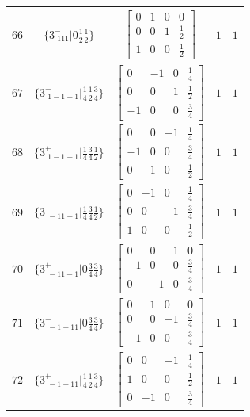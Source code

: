 \documentclass[fleqn,8pt]{jsarticle}
\begin{document}
\begin{longtable}{ccccc}
$ 66 $ & $ \{3^{-}_{\,\,111}|0 \frac{1}{2} \frac{1}{2}\} $ & $ \begin{bmatrix} 0 & 1 & 0 & 0 \\ 0 & 0 & 1 & \frac{1}{2} \\ 1 & 0 & 0 & \frac{1}{2} \end{bmatrix} $ & $ 1 $ & $ 1 $ \\ \hline
$ 67 $ & $ \{3^{-}_{\,\,1-1-1}|\frac{1}{4} \frac{1}{2} \frac{3}{4}\} $ & $ \begin{bmatrix} 0 & -1 & 0 & \frac{1}{4} \\ 0 & 0 & 1 & \frac{1}{2} \\ -1 & 0 & 0 & \frac{3}{4} \end{bmatrix} $ & $ 1 $ & $ 1 $ \\ \hline
$ 68 $ & $ \{3^{+}_{\,\,1-1-1}|\frac{1}{4} \frac{3}{4} \frac{1}{2}\} $ & $ \begin{bmatrix} 0 & 0 & -1 & \frac{1}{4} \\ -1 & 0 & 0 & \frac{3}{4} \\ 0 & 1 & 0 & \frac{1}{2} \end{bmatrix} $ & $ 1 $ & $ 1 $ \\ \hline
$ 69 $ & $ \{3^{-}_{\,\,-11-1}|\frac{1}{4} \frac{3}{4} \frac{1}{2}\} $ & $ \begin{bmatrix} 0 & -1 & 0 & \frac{1}{4} \\ 0 & 0 & -1 & \frac{3}{4} \\ 1 & 0 & 0 & \frac{1}{2} \end{bmatrix} $ & $ 1 $ & $ 1 $ \\ \hline
$ 70 $ & $ \{3^{+}_{\,\,-11-1}|0 \frac{3}{4} \frac{3}{4}\} $ & $ \begin{bmatrix} 0 & 0 & 1 & 0 \\ -1 & 0 & 0 & \frac{3}{4} \\ 0 & -1 & 0 & \frac{3}{4} \end{bmatrix} $ & $ 1 $ & $ 1 $ \\ \hline
$ 71 $ & $ \{3^{-}_{\,\,-1-11}|0 \frac{3}{4} \frac{3}{4}\} $ & $ \begin{bmatrix} 0 & 1 & 0 & 0 \\ 0 & 0 & -1 & \frac{3}{4} \\ -1 & 0 & 0 & \frac{3}{4} \end{bmatrix} $ & $ 1 $ & $ 1 $ \\ \hline
$ 72 $ & $ \{3^{+}_{\,\,-1-11}|\frac{1}{4} \frac{1}{2} \frac{3}{4}\} $ & $ \begin{bmatrix} 0 & 0 & -1 & \frac{1}{4} \\ 1 & 0 & 0 & \frac{1}{2} \\ 0 & -1 & 0 & \frac{3}{4} \end{bmatrix} $ & $ 1 $ & $ 1 $ \\ \hline

\end{longtable}
\end{document}
